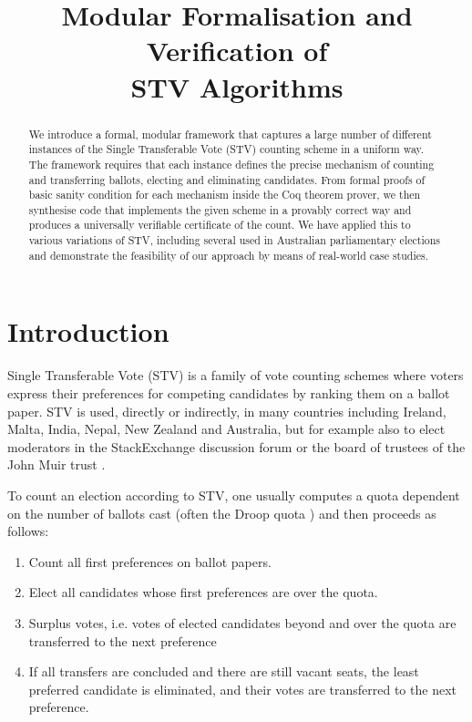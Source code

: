 \documentclass{llncs}
\title{Modular Formalisation and Verification of \\STV Algorithms}
\author{} %
\begin{document}
\maketitle
\pagestyle{plain}
\thispagestyle{empty}
\begin{abstract}
We introduce a formal, modular framework that captures a large number of
different instances of the Single Transferable Vote (STV) counting
scheme in a uniform way. The framework requires that each instance
defines the precise mechanism of counting and transferring ballots,
electing and eliminating candidates. From formal proofs of basic
sanity condition for each mechanism inside the Coq theorem prover, we then synthesise
code that implements the given scheme in a provably correct way and
produces a universally verifiable certificate of the count. We have
applied this to various variations of STV, including several  used in Australian
parliamentary elections and demonstrate the feasibility of our
approach by means of real-world case studies.
\end{abstract}

\section{Introduction}
 Single Transferable Vote (STV) is a family of 
 vote counting schemes where voters express their 
 preferences for competing candidates by ranking them on a ballot
 paper. STV is used, directly or indirectly, in many 
 countries including Ireland, Malta, India, Nepal, New Zealand and
 Australia, but for example also to elect moderators in the
 StackExchange discussion forum \cite{StackExchange:2018:ME} or the
 board of trustees of the John Muir trust \cite{Trust:2018:AT}. 

 To count an election according to STV, one usually computes a quota
 dependent on the number of ballots cast (often the Droop quota
 \cite{Droop:1881:MER}) and then proceeds as follows:
 \begin{enumerate}
 \item Count all first preferences on ballot papers.
 \item Elect all candidates whose first preferences are over the
 quota.
 \item Surplus votes, i.e. votes of elected candidates beyond and
 over the quota are transferred to the next preference
 \item If all transfers are concluded and there are still vacant
 seats, the least preferred candidate is eliminated, and their votes
 are transferred to the next preference.
 \end{enumerate}
\end{document}

